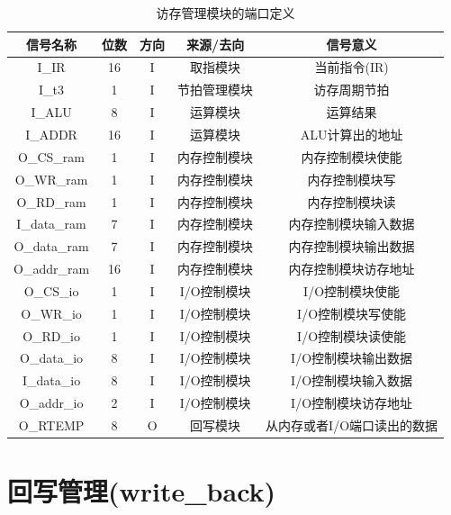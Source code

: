 \documentclass[forprint]{WHUBachelor}
\begin{document}
\begin{table}[H]
  \centering
  \begin{tabular}{c c c c c}
    \hline
    信号名称 & 位数 & 方向 & 来源/去向 & 信号意义 \\
    \hline
    I\_IR & 16 & I & 取指模块 & 当前指令(IR) \\
    I\_t3 & 1 & I & 节拍管理模块 & 访存周期节拍 \\
    I\_ALU & 8 & I & 运算模块 & 运算结果 \\
    I\_ADDR & 16 & I & 运算模块 & ALU计算出的地址 \\
    O\_CS\_ram & 1 & I & 内存控制模块 & 内存控制模块使能 \\
    O\_WR\_ram & 1 & I & 内存控制模块 & 内存控制模块写 \\
    O\_RD\_ram & 1 & I & 内存控制模块 & 内存控制模块读 \\
    I\_data\_ram & 7 & I & 内存控制模块 & 内存控制模块输入数据 \\
    O\_data\_ram & 7 & I & 内存控制模块 & 内存控制模块输出数据 \\
    O\_addr\_ram & 16 & I & 内存控制模块 & 内存控制模块访存地址 \\
    O\_CS\_io & 1 & I & I/O控制模块 & I/O控制模块使能 \\
    O\_WR\_io & 1 & I & I/O控制模块 & I/O控制模块写使能 \\
    O\_RD\_io & 1 & I & I/O控制模块 & I/O控制模块读使能\\
    O\_data\_io & 8 & I & I/O控制模块 &  I/O控制模块输出数据\\
    I\_data\_io & 8 & I & I/O控制模块 &  I/O控制模块输入数据\\
    O\_addr\_io & 2 & I & I/O控制模块 &  I/O控制模块访存地址\\
    O\_RTEMP & 8 & O & 回写模块 & 从内存或者I/O端口读出的数据\\
    \hline
  \end{tabular}
  \caption{访存管理模块的端口定义}
  \label{tab:ports:refer}
\end{table}

\section{回写管理(write\_back)}
\end{document}
